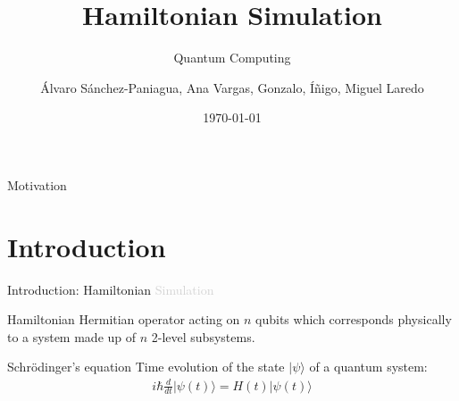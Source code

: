 \documentclass[aspectratio=169,xcolor=dvipsnames]{beamer}
\title{Hamiltonian Simulation}
\subtitle{Quantum Computing}
\author{Álvaro Sánchez-Paniagua, Ana Vargas, Gonzalo, Íñigo, Miguel Laredo}
\institute
{
    Based on the notes from Ashley Montaro %
}
\date{\today} %
\begin{document}
\begin{frame}
    \titlepage
\end{frame}

\begin{frame}{Motivation}
\end{frame}








\section{Introduction}
\begin{frame}{Introduction: Hamiltonian \textcolor{lightgray}{Simulation}}
    \begin{block}{Hamiltonian}
        Hermitian operator acting on $n$ qubits which corresponds physically to a system made up of $n$ 2-level subsystems.
    \end{block}
    \begin{block}{Schrödinger’s equation}
        Time evolution of the state $|\psi\rangle$ of a quantum system:
        \begin{align*}
            i \hbar \frac{d}{dt}|\psi(t)\rangle = H(t)|\psi(t)\rangle
        \end{align*}
    \end{block}
\end{frame}
\end{document}
